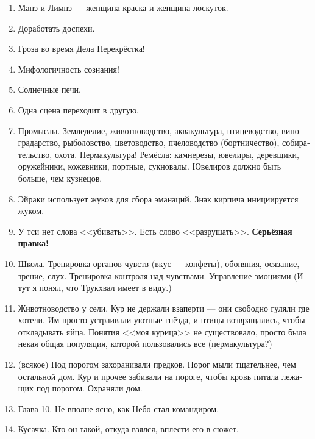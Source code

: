 \documentclass[a4paper,12pt,fleqn]{book}\usepackage{polyglossia}\setdefaultlanguage[babelshorthands=true]{russian}\setotherlanguage{english}\defaultfontfeatures{Ligatures=TeX,Mapping=tex-text}\usepackage{xcolor}\newcommand{\ml}[3]{#2}
\begin{document}
{\begin{enumerate}
\item Манэ и Лимнэ --- женщина-краска и женщина-лоскуток.

\item Доработать доспехи.

\item Гроза во время Дела Перекрёстка!

\item Мифологичность сознания!

\item Солнечные печи.

\item Одна сцена переходит в другую.

\item Промыслы.
Земледелие, животноводство, аквакультура, птицеводство, виноградарство, рыболовство, цветоводство, пчеловодство (бортничество), собирательство, охота.
Пермакультура!
Ремёсла: камнерезы, ювелиры, деревщики, оружейники, кожевники, портные, сукновалы.
Ювелиров должно быть больше, чем кузнецов.

\item Эйраки использует жуков для сбора эманаций.
Знак кирпича инициируется жуком.

\item У тси нет слова <<убивать>>.
Есть слово <<разрушать>>.
\textbf{Серьёзная правка!}

\item Школа.
Тренировка органов чувств (вкус --- конфеты), обоняния, осязание, зрение, слух.
Тренировка контроля над чувствами.
Управление эмоциями (И тут я понял, что Трукхвал имеет в виду.)

\item Животноводство у сели.
Кур не держали взаперти --- они свободно гуляли где хотели.
Им просто устраивали уютные гнёзда, и птицы возвращались, чтобы откладывать яйца.
Понятия <<моя курица>> не существовало, просто была некая общая популяция, которой пользовались все (пермакультура?)

\item (всякое) Под порогом захоранивали предков.
Порог мыли тщательнее, чем остальной дом.
Кур и прочее забивали на пороге, чтобы кровь питала лежащих под порогом.
Охраняли дом.

\item Глава 10.
Не вполне ясно, как Небо стал командиром.

\item Кусачка.
Кто он такой, откуда взялся, вплести его в сюжет.


\end{enumerate}}
\end{document}
